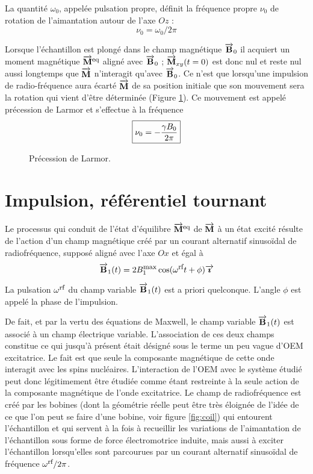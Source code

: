 La quantité $\omega_0$, appelée pulsation propre, définit la fréquence propre
$\nu_0$ de rotation de l'aimantation autour de l'axe $Oz$ :
\begin{equation}
\nu_0 = \omega_0 / 2\pi
\end{equation}

Lorsque l'échantillon est plongé dans le champ magnétique
$\overrightarrow{\mathbf{B}}_0$ il acquiert un moment
magnétique $\overrightarrow{\mathbf{M}}^{\mbox{\footnotesize{eq}}}$ aligné avec $\overrightarrow{\mathbf{B}}_0$ ;
$\overrightarrow{\mathbf{M}}_{xy}(t=0)$ est donc nul et reste nul aussi longtemps que
$\overrightarrow{\mathbf{M}}$ n'interagit qu'avec $\overrightarrow{\mathbf{B}}_0$.
Ce n'est que lorsqu'une impulsion de radio-fréquence aura écarté
$\overrightarrow{\mathbf{M}}$ de sa position initiale que son mouvement sera la rotation qui vient
d'être déterminée (Figure \ref{fig:larmor}).
Ce mouvement est appelé précession de Larmor et s'effectue à la fréquence
\begin{equation}
 \fbox{$ \displaystyle
\nu_0 = -\frac{\gamma B_0}{2\pi}
 $}
\end{equation}

\begin{figure}[hbt]
\begin{center}
\end{center}
\caption{Précession de Larmor.}
\label{fig:larmor}
\end{figure}

\section{Impulsion, référentiel tournant}
\label{sec:rf}
Le processus qui conduit de l'état d'équilibre $\overrightarrow{\mathbf{M}}^{\mbox{\footnotesize{eq}}}$ de $\overrightarrow{\mathbf{M}}$
à un état excité résulte de l'action
d'un champ magnétique créé par un courant alternatif sinusoïdal de radiofréquence,
supposé aligné avec l'axe $Ox$ et égal à
\begin{equation}
\overrightarrow{\mathbf{B}}_1(t) =
2B_1^{\mbox{\footnotesize{max}}} \cos(\omega^{\mbox{\footnotesize{rf}}} t+\phi) \overrightarrow{\boldsymbol{\imath}}
\end{equation}

La pulsation $\omega^{\mbox{\footnotesize{rf}}}$ du champ variable $\overrightarrow{\mathbf{B}}_1(t)$
est a priori quelconque.
L'angle $\phi$ est appelé la phase de l'impulsion.

De fait, et par la vertu des équations de Maxwell, le champ variable
$\overrightarrow{\mathbf{B}}_1(t)$ est associé à un champ électrique variable.
L'association de ces deux champs constitue ce qui jusqu'à présent
était désigné sous le terme un peu vague d'OEM excitatrice.
Le fait est que seule la composante magnétique de cette onde
interagit avec les spins nucléaires.
L'interaction de l'OEM avec le système étudié peut donc légitimement
être étudiée comme étant restreinte à la seule action de la composante magnétique
de l'onde excitatrice.
Le champ de radiofréquence est créé par les bobines (dont la géométrie
réelle peut être très éloignée de l'idée de ce que l'on peut se faire d'une bobine,
voir figure \ref{fig:coil})
qui entourent l'échantillon et qui servent à la fois à recueillir les variations
de l'aimantation de l'échantillon sous forme de force électromotrice induite,
mais aussi à exciter l'échantillon lorsqu'elles sont parcourues par
un courant alternatif sinusoïdal de fréquence $\omega^{\mbox{\footnotesize{rf}}}/2\pi$.

